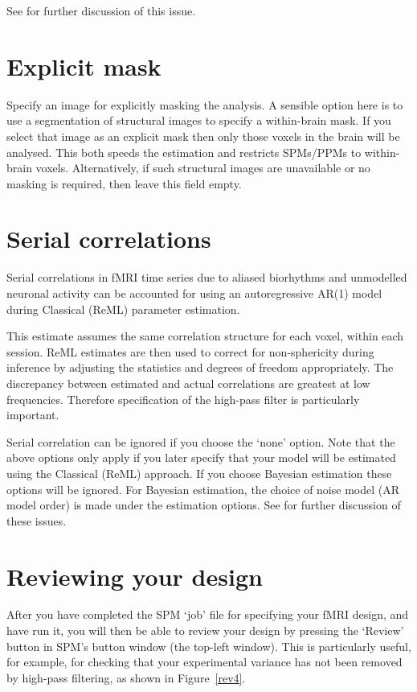 See \cite{ja_global} for further discussion of this issue.

\section{Explicit mask}

Specify an image for explicitly masking the analysis. A sensible option here is to use a segmentation of structural images to specify a within-brain mask. If you select that image as an explicit mask then only those voxels in the brain will be analysed. This both speeds the estimation and restricts SPMs/PPMs to within-brain voxels. Alternatively, if such structural images are unavailable or no masking is required, then leave this field empty.

\section{Serial correlations}

Serial correlations in fMRI time series due to aliased biorhythms and unmodelled neuronal activity can be accounted for using an autoregressive AR(1) model during Classical (ReML) parameter estimation.  

This estimate assumes the same correlation structure for each voxel, within each session.  ReML estimates are then used to correct for non-sphericity during inference by adjusting the statistics and degrees of freedom appropriately.  The discrepancy between estimated and actual correlations are greatest at low frequencies.  Therefore specification of the high-pass filter is particularly important.                                                                                             

Serial correlation can be ignored if you choose the `none' option. Note that the above options only apply if you later specify that your model will be estimated using the Classical (ReML) approach. If you choose Bayesian estimation these options will be ignored. For Bayesian estimation, the choice of noise model (AR model order) is made under the estimation options. See \cite{peb1,vb_fmri_ar} for further discussion of these issues.

\section{Reviewing your design \label{explore}}

After you have completed the SPM `job' file for specifying your fMRI design, and have run it, you will then be able to review your design by pressing the `Review' button in SPM's button window (the top-left window). This is particularly useful, for example, for checking that your experimental variance has not been removed by high-pass filtering, as shown in Figure~\ref{rev4}.

